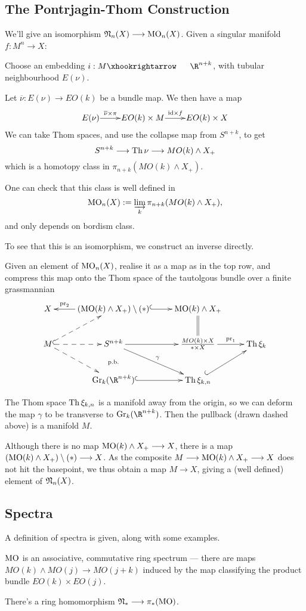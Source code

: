\documentclass[11pt]{article}
\begin{document}
\subsection{The Pontrjagin-Thom Construction}
We'll give an isomorphism $\mathfrak{N}_n(X)\longrightarrow\operatorname{{MO}}_n(X)$. Given a singular manifold $f:M^n\to X$:
\begin{itemise}
\item Choose an embedding $i:M\cofibration\R^{n+k}$, with tubular neighbourhood $E(\nu)$.
\item Let $\overline{\nu}:E(\nu)\to EO(k)$ be a bundle map. We then have a map
\[\vcenter{\xymatrix@1{
E(\nu)\ar[r]^-{\overline{\nu}\times\pi}
&%
EO(k)\times M
\ar[r]^-{\id\times f}
&%
EO(k)\times X%
}}\]
We can take Thom spaces, and use the collapse map from $S^{n+k}$, to get
\[S^{n+k}\longrightarrow\operatorname{Th}\nu\longrightarrow MO(k)\wedge X_+\]
which is a homotopy class in $\pi_{n+k}(MO(k)\wedge X_+)$.
\item One can check that this class is well defined in
\[\operatorname{{MO}}_n(X):=\varinjlim_k\pi_{n+k}(MO(k)\wedge X_+),\]
and only depends on bordism class.
\end{itemise}
To see that this is an isomorphism, we construct an inverse directly.
\begin{itemise}
\item Given an element of $\operatorname{{MO}}_n(X)$, realise it as a map as in the top row, and compress this map onto the Thom space of the tautolgous bundle over a finite grassmannian
\[\xymatrix{
X&
(\MO(k)\wedge X_+)\setminus(\ast)
\ar@{^{(}->}[r]
\ar[l]_-{\textup{pr}_2}
&
\MO(k)\wedge X_+
\ar@{=}[d]
&
\\
M
\ar@{-->}[ur]
\ar@{^{(}-->}[r]
\ar@{-->}[rd]
&%
S^{n+k}
\ar@{}[d]|{\textup{p.b.}}
\ar[r]
\ar[rd]^\gamma
&%
\frac{MO(k)\times X}{\ast\times X}
\ar[r]^-{\textup{pr}_1}
&%
\Thom\xi_k
\\&%
\Gr_k(\R^{n+k})
\ar@{^{(}->}[r]
&%
\Thom \xi_{k,n}
\ar@{^{(}->}[ur]
&%
}\]
\item The Thom space $\operatorname{Th} \xi_{k,n}$ is a manifold away from the origin, so we can deform the map $\gamma$ to be transverse to $\Gr_{k}(\R^{n+k})$. Then the pullback (drawn dashed above) is a manifold $M$.
\item Although there is no map $\operatorname{{MO}}(k)\wedge X_+\longrightarrow X$, there is a map $(\operatorname{{MO}}(k)\wedge X_+)\setminus(*)\longrightarrow X$. As the composite $M\longrightarrow\operatorname{{MO}}(k)\wedge X_+\longrightarrow X$ does not hit the basepoint, we thus obtain a map $M\to X$, giving a (well defined) element of $\mathfrak{N}_n(X)$.
\end{itemise}
\subsection{Spectra}
\begin{itemise}
\item A definition of spectra is given, along with some examples. 
\item $\operatorname{{MO}}$ is an associative, commutative ring spectrum --- there are maps $MO(k)\wedge MO(j)\to MO(j+k)$ induced by the map classifying the product bundle $EO(k)\times EO(j)$.
\item There's a ring homomorphism $\mathfrak{N}_*\longrightarrow \pi_{*}(\operatorname{{MO}})$.
\end{itemise}
\end{document}
